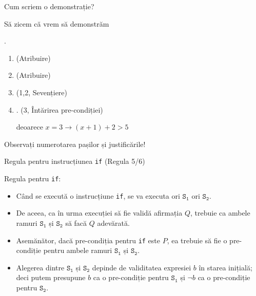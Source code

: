 \begin{frame}{Cum scriem o demonstrație?}

\vspace{-.6cm}
\begin{example}
Să zicem că vrem să demonstrăm
\begin{center}
.
\end{center}

\pause
\begin{enumerate}[<+->]
	\item {} \hfill (Atribuire)
	\item {} \hfill (Atribuire)
	\item {} \hfill (1,2, Sevențiere)
	\item {}. \hfill{(3, Întărirea pre-condiției)}

	deoarece $x=3 \to (x+1) + 2 > 5$
\end{enumerate}
\end{example}

Observați numerotarea pașilor și justificările!
\end{frame}

\begin{frame}{Regula pentru instrucțiunea {\tt if} (Regula 5/6)}

\alert{Regula pentru {\tt if}:}
\begin{center}
\end{center}

\pause
\begin{itemize}
	\item Când se execută o instrucțiune {\tt if}, se va executa ori $\mathtt{S_1}$ ori $\mathtt{S_2}$.
	\item De aceea, ca în urma execuției să fie validă afirmația $Q$, trebuie ca \alert{ambele} ramuri $\mathtt{S_1}$ și $\mathtt{S_2}$ să facă $Q$ adevărată.
	\item Asemănător, dacă pre-condiția pentru {\tt if} este $P$, ea trebuie să fie \alert{o} pre-condiție pentru \alert{ambele} ramuri $\mathtt{S_1}$  și $\mathtt{S_2}$.
	\item Alegerea dintre $\mathtt{S_1}$ și $\mathtt{S_2}$ depinde de validitatea expresiei $b$ în starea inițială; deci putem presupune $b$ ca \alert{o} pre-condiție pentru $\mathtt{S_1}$ și $\neg b$ ca \alert{o} pre-condiție pentru $\mathtt{S_2}$.
\end{itemize}
\end{frame}

